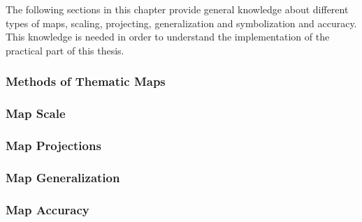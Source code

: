 The following sections in this chapter provide general knowledge about different types of maps, scaling, projecting, generalization and symbolization and accuracy. This knowledge is needed in order to understand the implementation of the practical part of this thesis.

\subsubsection{Methods of Thematic Maps}


\subsubsection{Map Scale}
\label{s:map-scale}


\subsubsection{Map Projections}

\label{s:map-projections}

\subsubsection{Map Generalization}


\subsubsection{Map Accuracy}
\label{s:map-accuracy}

